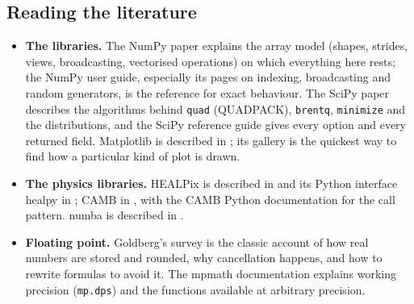 \subsection*{Reading the literature}
\label{T0a:sec:reading}

\begin{itemize}[itemsep=2pt,leftmargin=1.2em]
  \item \textbf{The libraries.} The NumPy paper \cite{HarrisNumPy2020} explains the array model (shapes, strides, views, broadcasting, vectorised operations) on which everything here rests; the NumPy user guide, especially its pages on indexing, broadcasting and random generators, is the reference for exact behaviour. The SciPy paper \cite{VirtanenSciPy2020} describes the algorithms behind \texttt{quad} (QUADPACK), \texttt{brentq}, \texttt{minimize} and the distributions, and the SciPy reference guide gives every option and every returned field. Matplotlib is described in \cite{HunterMatplotlib2007}; its gallery is the quickest way to find how a particular kind of plot is drawn.
  \item \textbf{The physics libraries.} HEALPix is described in \cite{Gorski2005} and its Python interface healpy in \cite{ZoncaHealpy2019}; CAMB in \cite{CAMB2000}, with the CAMB Python documentation for the call pattern. numba is described in \cite{LamNumba2015}.
  \item \textbf{Floating point.} Goldberg's survey \cite{GoldbergFloat1991} is the classic account of how real numbers are stored and rounded, why cancellation happens, and how to rewrite formulas to avoid it. The mpmath documentation explains working precision (\texttt{mp.dps}) and the functions available at arbitrary precision.
\end{itemize}
  